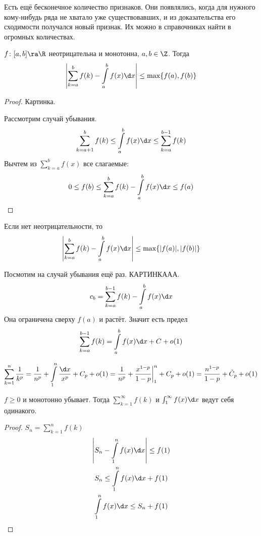 Есть ещё бесконечное количество признаков.
Они появлялись, когда для нужного кому-нибудь ряда не хватало уже существовавших, и из доказательства его сходимости получался новый признак.
Их можно в справочниках найти в огромных количествах.

\begin{theorem}
	$f\colon [a, b] \ra \R$ неотрицательна и монотонна, $a, b \in \Z$.
	Тогда
	\[ \left| \sum_{k=a}^b f(k) - \int\limits_a^b f(x) \d x\right| \le \max \{f(a), f(b)\} \]
\end{theorem}
\begin{proof}
	\TODO Картинка.

	Рассмотрим случай убывания.
	\[ \sum_{k=a+1}^b f(k) \le \int\limits_a^b f(x) \d x \le \sum_{k=a}^{b-1} f(k) \]
	Вычтем из $\sum_{k=a}^b f(x)$ все слагаемые:
	\[ 0 \le f(b) \le \sum_{k=a}^b f(k) - \int\limits_a^b f(x) \d x \le f(a) \]
\end{proof}
\begin{Rem}
	Если нет неотрицательности, то
	\[ \left| \sum_{k=a}^b f(k) - \int\limits_a^b f(x) \d x\right| \le \max \{|f(a)|, |f(b)|\} \]
\end{Rem}
\begin{Rem}
	Посмотим на случай убывания ещё раз.
	КАРТИНКААА.
	\[ c_b = \sum_{k=a}^{b-1} f(k) - \int\limits_a^b f(x) \d x\]
	Она ограничена сверху $f(a)$ и растёт.
	Значит есть предел
	\[ \sum_{k=a}^{b-1} f(k) = \int\limits_a^b f(x) \d x + C + o(1) \]
\end{Rem}

\begin{exmp}
	\[
		\sum_{k=1}^n \frac1{k^p}
		= \frac1{n^p} + \int\limits_1^n \frac{\d x}{x^p} + C_p + o(1)
		= \frac1{n^p} + \frac{x^{1-p}}{1-p} \biggr|_1^n + C_p + o(1)
		= \frac{n^{1-p}}{1-p} + \tilde C_p + o(1)
	\]
\end{exmp}

\begin{theorem}
	$f \ge 0$ и монотонно убывает.
	Тогда $\sum_{k=1}^\infty f(k)$ и $\int_1^\infty f(x) \d x$ ведут себя одинакого.
\end{theorem}
\begin{proof}
	$S_n = \sum_{k=1}^n f(k)$
	\begin{gather*}
		\left|S_n - \int\limits_1^n f(x) \d x\right| \le f(1) \\
		S_n \le \int\limits_1^n f(x) \d x + f(1) \\
		\int\limits_1^n f(x) \d x \le S_n + f(1)
	\end{gather*}
\end{proof}
